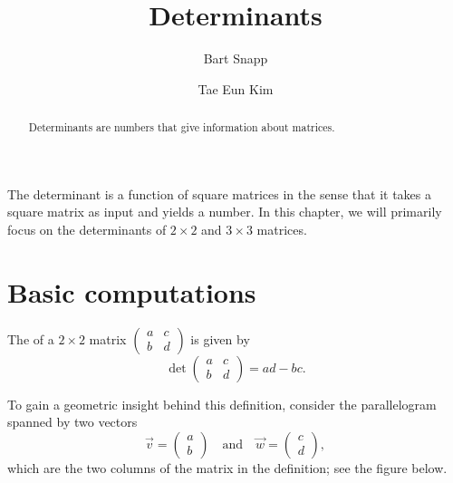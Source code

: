 \documentclass{ximera}
\author{Bart Snapp \and Tae Eun Kim}
\title{Determinants}
\begin{document}
\begin{abstract}
  Determinants are numbers that give information about matrices.
\end{abstract}
\maketitle

The determinant is a function of square matrices in the sense that it
takes a square matrix as input and yields a number. In this chapter,
we will primarily focus on the determinants of $2 \times 2$ and
$3 \times 3$ matrices.

\section{Basic computations}

\begin{definition}
  The  of a $2 \times 2$ matrix $\begin{pmatrix} a & c \\
    b & d \end{pmatrix}$ is given by
  \[
    \det
    \begin{pmatrix}
      a & c\\
      b & d
    \end{pmatrix}
    = ad - bc.
  \]
\end{definition}

To gain a geometric insight behind this definition, consider the
parallelogram spanned by two vectors
\[
  \vec{v} =
  \begin{pmatrix}
    a \\ b
  \end{pmatrix}
  \quad\text{and}\quad
  \vec{w} =
  \begin{pmatrix}
    c \\d
  \end{pmatrix},
\]
which are the two columns of the matrix in the definition; see the
figure below.
\end{document}
